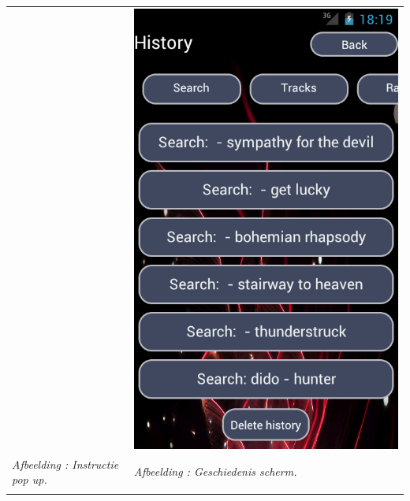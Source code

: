 \documentclass[11pt,a4paper]{article}
\newcounter{figc}
\newcommand{\figID} {%
   \stepcounter{figc}%
   \thefigc}
\begin{document}
{\begin{tabular} {p{7cm} >{\centering\arraybackslash}p{7cm}@{\hskip 0.5in}}
		& \includegraphics[scale=0.37]{Pictures/device-2013-05-31-202010.png} \\
		
		\centering \small \textit{Afbeelding \figID : Instructie pop up.}  \normalsize
		&  \small \textit{Afbeelding \figID : Geschiedenis scherm.} \\  \normalsize
		\vspace{1pt} & \vspace{1pt} \\
		

\end{tabular}}
\end{document}
